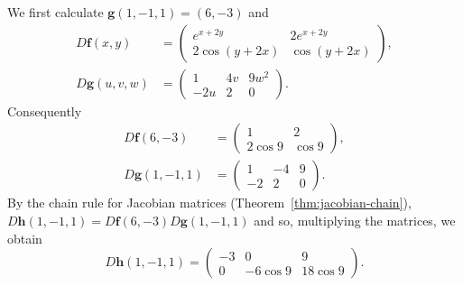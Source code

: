 \solution
We first calculate \(\mathbf{g}(1,-1,1) = (6,-3)\) and
\[
    \begin{aligned}
        D\mathbf{f}(x,y)   & =
        \begin{pmatrix}
            e^{x+2y}     & 2 e^{x+2y} \\
            2 \cos(y+2x) & \cos(y+2x)
        \end{pmatrix}, \\
        D\mathbf{g}(u,v,w) & =
        \begin{pmatrix}
            1   & 4v & 9w^2 \\
            -2u & 2  & 0
        \end{pmatrix}.
    \end{aligned}
\]
Consequently
\[
    \begin{aligned}
        D\mathbf{f}(6,-3)   & =
        \begin{pmatrix}
            1        & 2      \\
            2 \cos 9 & \cos 9
        \end{pmatrix},       \\
        D\mathbf{g}(1,-1,1) & =
        \begin{pmatrix}
            1  & -4 & 9 \\
            -2 & 2  & 0
        \end{pmatrix}.
    \end{aligned}
\]
By the chain rule for Jacobian matrices (Theorem~\ref{thm:jacobian-chain}),
\( D\mathbf{h}(1,-1,1) = D\mathbf{f}(6,-3)  D\mathbf{g}(1,-1,1) \)
and so, multiplying the matrices, we obtain
$$D\mathbf{h}(1,-1,1) =
    \begin{pmatrix}
        -3 & 0        & 9        \\
        0  & -6\cos 9 & 18\cos 9
    \end{pmatrix}.
$$





